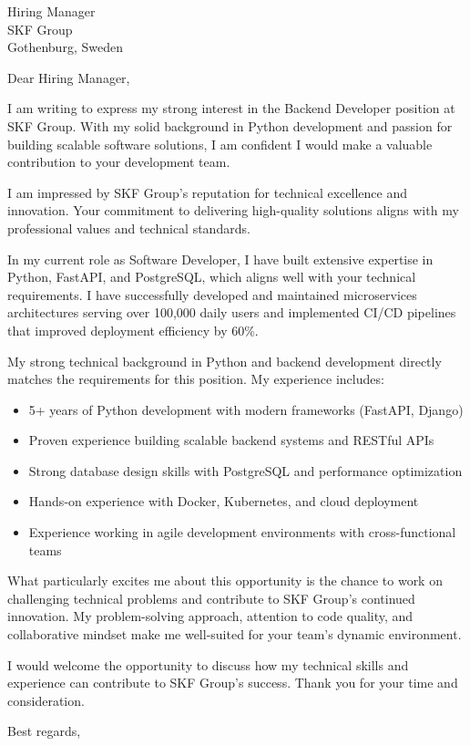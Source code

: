 \documentclass[11pt,a4paper]{letter}
\begin{document}
\begin{letter}{Hiring Manager \\ SKF Group \\ Gothenburg, Sweden}

\opening{Dear Hiring Manager,}

I am writing to express my strong interest in the Backend Developer position at SKF Group. With my solid background in Python development and passion for building scalable software solutions, I am confident I would make a valuable contribution to your development team.

I am impressed by SKF Group's reputation for technical excellence and innovation. Your commitment to delivering high-quality solutions aligns with my professional values and technical standards.

In my current role as Software Developer, I have built extensive expertise in Python, FastAPI, and PostgreSQL, which aligns well with your technical requirements. I have successfully developed and maintained microservices architectures serving over 100,000 daily users and implemented CI/CD pipelines that improved deployment efficiency by 60\%.

My strong technical background in Python and backend development directly matches the requirements for this position. My experience includes:

\begin{itemize}
\item 5+ years of Python development with modern frameworks (FastAPI, Django)
\item Proven experience building scalable backend systems and RESTful APIs
\item Strong database design skills with PostgreSQL and performance optimization
\item Hands-on experience with Docker, Kubernetes, and cloud deployment
\item Experience working in agile development environments with cross-functional teams
\end{itemize}

What particularly excites me about this opportunity is the chance to work on challenging technical problems and contribute to SKF Group's continued innovation. My problem-solving approach, attention to code quality, and collaborative mindset make me well-suited for your team's dynamic environment.

I would welcome the opportunity to discuss how my technical skills and experience can contribute to SKF Group's success. Thank you for your time and consideration.

\closing{Best regards,}

\end{letter}
\end{document}
